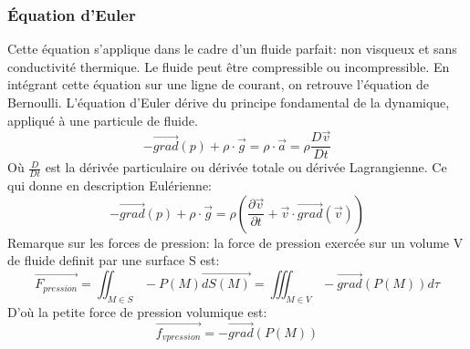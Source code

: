 \documentclass[10pt,a4paper]{article}
\begin{document}
\subsubsection{Équation d'Euler\cite{eqeuler}}
Cette équation s'applique dans le cadre d'un fluide parfait: non visqueux et sans conductivité thermique. Le fluide peut être compressible ou incompressible. En intégrant cette équation sur une ligne de courant, on retrouve l'équation de Bernoulli. L'équation d'Euler dérive du principe fondamental de la dynamique, appliqué à une particule de fluide.
\begin{equation}
-\overrightarrow{grad}(p) + \rho\cdot\overrightarrow{g} = \rho\cdot\overrightarrow{a} = \rho\frac{D\overrightarrow{v}}{Dt}
\end{equation}
Où $\frac{D }{Dt}$ est la dérivée particulaire ou dérivée totale ou dérivée Lagrangienne. Ce qui donne en description Eulérienne:
\begin{equation}
-\overrightarrow{grad}(p) + \rho\cdot\overrightarrow{g} =  \rho(\frac{\partial \overrightarrow{v}}{\partial t} + \overrightarrow{v}\cdot\overrightarrow{grad}(\overrightarrow{v}))
\end{equation}
Remarque sur les forces de pression: la force de pression exercée sur un volume V de fluide definit par une surface S est:
\begin{equation}
\overrightarrow{F_{pression}} = \iint_{M \in S} -P(M) \overrightarrow{dS(M)} = \iiint_{M \in V} -\overrightarrow{grad}(P(M))d\tau
\end{equation}
D'où la petite force de pression volumique est:
\begin{equation}
\overrightarrow{f_{vpression}} = -\overrightarrow{grad}(P(M))
\end{equation}

\end{document}
